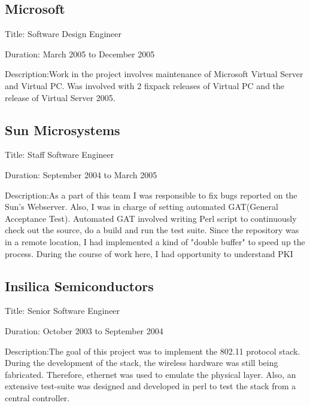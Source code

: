 \documentclass [a4paper,11pt] {article}
\begin{document}
\subsection*{Microsoft}
\begin{description}
\item{Title:} Software Design Engineer
\item{Duration:} March 2005 to December 2005
\item{Description:}Work in the project involves maintenance of Microsoft Virtual Server and Virtual PC. Was involved with 2 fixpack releases of Virtual PC and the release of Virtual Server 2005.
\end{description}

\subsection*{Sun Microsystems}
\begin{description}
\item{Title:} Staff Software Engineer
\item{Duration:} September 2004 to March 2005
\item{Description:}As a part of this team I was responsible to fix bugs reported on the Sun's Webserver. Also, I was in charge of setting automated GAT(General Acceptance Test). Automated GAT involved writing Perl script to continuously check out the source, do a build and run the test suite. Since the repository was in a remote location, I had implemented a kind of "double buffer" to speed up the process.
During the course of work here, I had opportunity to understand PKI
\end{description}


\subsection*{Insilica Semiconductors}
\begin{description}
\item{Title:} Senior Software Engineer
\item{Duration:} October 2003 to September 2004
\item{Description:}The goal of this project was to implement the 802.11 protocol stack. During the development of the stack, the wireless hardware was still being fabricated. Therefore, ethernet was used to emulate the physical layer.  Also, an extensive test-suite was designed and developed in perl to test the stack from a central controller.
\end{description}
\end{document}
